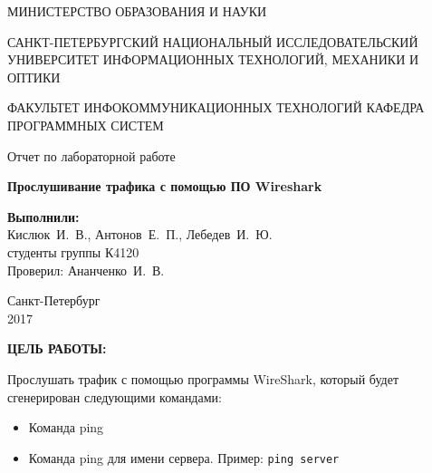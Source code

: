 \documentclass[14pt,a4paper]{extreport}
\newcommand{\anan}{Ананченко~И.~В.}
\newcommand{\igork}{Кислюк~И.~В.}
\newcommand{\egor}{Антонов~Е.~П.}
\newcommand{\igorl}{Лебедев~И.~Ю.}
\begin{document}
	\begin{titlepage}
	\begin{center}	
		\fontsize{14pt}{14pt}\selectfont
		МИНИСТЕРСТВО ОБРАЗОВАНИЯ И НАУКИ\\

		\vspace*{0.6\baselineskip}
		
		САНКТ-ПЕТЕРБУРГСКИЙ НАЦИОНАЛЬНЫЙ ИССЛЕДОВАТЕЛЬСКИЙ УНИВЕРСИТЕТ ИНФОРМАЦИОННЫХ ТЕХНОЛОГИЙ, МЕХАНИКИ И ОПТИКИ
		
		\vspace*{0.6\baselineskip}
		ФАКУЛЬТЕТ ИНФОКОММУНИКАЦИОННЫХ ТЕХНОЛОГИЙ
		КАФЕДРА ПРОГРАММНЫХ СИСТЕМ
	
		\vspace*{7\baselineskip}
		\fontsize{19pt}{18pt}\selectfont
		Отчет по лабораторной работе
		
		\fontsize{20pt}{18pt}\selectfont
		\textbf{Прослушивание трафика с помощью ПО Wireshark}\\
		\vspace*{1.15\baselineskip}
		\end{center}
	
	\vspace*{2\baselineskip}
	\begin{flushright}
	\fontsize{14pt}{14pt}\selectfont
	\textbf{Выполнили:}\\
	\igork, \egor, \igorl\\
	студенты группы К4120\\
	Проверил: \anan\\
	\end{flushright}
	
	\vspace{\fill}
	\begin{center}
	Санкт-Петербург\\
	2017
	\end{center}
	
\end{titlepage}

\newpage

\fontsize{16pt}{14pt}\selectfont
\begin{center}
\textbf{ЦЕЛЬ РАБОТЫ:}
\end{center}

Прослушать трафик с помощью программы WireShark, который будет сгенерирован следующими командами:

\begin{itemize}
\item Команда ping
\item Команда ping для имени сервера. Пример: \verb|ping server|
\end{itemize}
\end{document}
